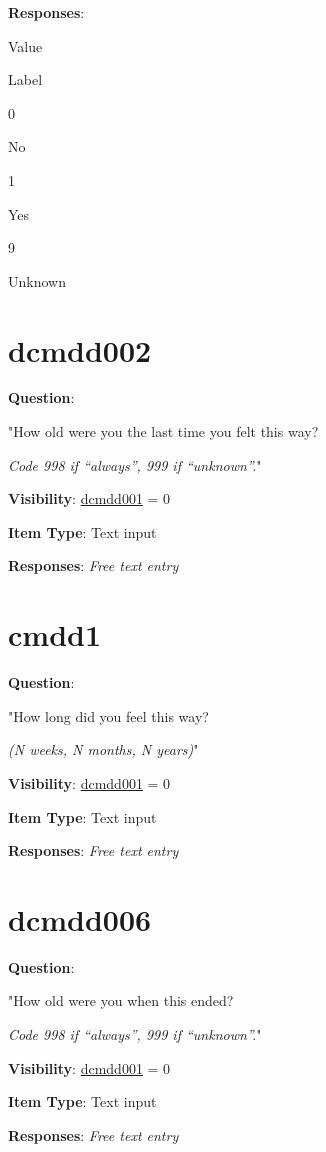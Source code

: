 \documentclass[
]{book}
\begin{document}
\textbf{Responses}:

Value

Label

0

No

1

Yes

9

Unknown

\hypertarget{dcmdd002}{%
\section{dcmdd002}\label{dcmdd002}}

\textbf{Question}:

"How old were you the last time you felt this way?

\emph{Code 998 if ``always'', 999 if ``unknown''.}"

\textbf{Visibility}: \protect\hyperlink{dcmdd001}{dcmdd001} = 0

\textbf{Item Type}: Text input

\textbf{Responses}: \emph{Free text entry}

\hypertarget{cmdd1}{%
\section{cmdd1}\label{cmdd1}}

\textbf{Question}:

"How long did you feel this way?

\emph{(N weeks, N months, N years)}"

\textbf{Visibility}: \protect\hyperlink{dcmdd001}{dcmdd001} = 0

\textbf{Item Type}: Text input

\textbf{Responses}: \emph{Free text entry}

\hypertarget{dcmdd006}{%
\section{dcmdd006}\label{dcmdd006}}

\textbf{Question}:

"How old were you when this ended?

\emph{Code 998 if ``always'', 999 if ``unknown''.}"

\textbf{Visibility}: \protect\hyperlink{dcmdd001}{dcmdd001} = 0

\textbf{Item Type}: Text input

\textbf{Responses}: \emph{Free text entry}
\end{document}
